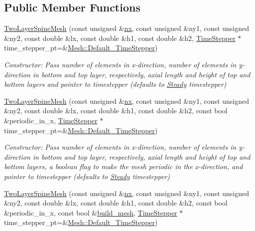 \subsection*{Public Member Functions}
\begin{DoxyCompactItemize}
\item 
\hyperlink{classoomph_1_1TwoLayerSpineMesh_a0c41a93e9ccaaa34956215e64611be2a}{Two\+Layer\+Spine\+Mesh} (const unsigned \&\hyperlink{classoomph_1_1RectangularQuadMesh_abfef93d6322886cdce14a437186e4821}{nx}, const unsigned \&ny1, const unsigned \&ny2, const double \&lx, const double \&h1, const double \&h2, \hyperlink{classoomph_1_1TimeStepper}{Time\+Stepper} $\ast$time\+\_\+stepper\+\_\+pt=\&\hyperlink{classoomph_1_1Mesh_a12243d0fee2b1fcee729ee5a4777ea10}{Mesh\+::\+Default\+\_\+\+Time\+Stepper})
\begin{DoxyCompactList}\small\item\em Constructor\+: Pass number of elements in x-\/direction, number of elements in y-\/direction in bottom and top layer, respectively, axial length and height of top and bottom layers and pointer to timestepper (defaults to \hyperlink{classoomph_1_1Steady}{Steady} timestepper) \end{DoxyCompactList}\item 
\hyperlink{classoomph_1_1TwoLayerSpineMesh_a8787a305ee929d001542464529e23787}{Two\+Layer\+Spine\+Mesh} (const unsigned \&\hyperlink{classoomph_1_1RectangularQuadMesh_abfef93d6322886cdce14a437186e4821}{nx}, const unsigned \&ny1, const unsigned \&ny2, const double \&lx, const double \&h1, const double \&h2, const bool \&periodic\+\_\+in\+\_\+x, \hyperlink{classoomph_1_1TimeStepper}{Time\+Stepper} $\ast$time\+\_\+stepper\+\_\+pt=\&\hyperlink{classoomph_1_1Mesh_a12243d0fee2b1fcee729ee5a4777ea10}{Mesh\+::\+Default\+\_\+\+Time\+Stepper})
\begin{DoxyCompactList}\small\item\em Constructor\+: Pass number of elements in x-\/direction, number of elements in y-\/direction in bottom and top layer, respectively, axial length and height of top and bottom layers, a boolean flag to make the mesh periodic in the x-\/direction, and pointer to timestepper (defaults to \hyperlink{classoomph_1_1Steady}{Steady} timestepper) \end{DoxyCompactList}\item 
\hyperlink{classoomph_1_1TwoLayerSpineMesh_a374454978976c3873a89bedc688b983f}{Two\+Layer\+Spine\+Mesh} (const unsigned \&\hyperlink{classoomph_1_1RectangularQuadMesh_abfef93d6322886cdce14a437186e4821}{nx}, const unsigned \&ny1, const unsigned \&ny2, const double \&lx, const double \&h1, const double \&h2, const bool \&periodic\+\_\+in\+\_\+x, const bool \&\hyperlink{classoomph_1_1RectangularQuadMesh_afa579b413a2d8120e8228d840cb3582c}{build\+\_\+mesh}, \hyperlink{classoomph_1_1TimeStepper}{Time\+Stepper} $\ast$time\+\_\+stepper\+\_\+pt=\&\hyperlink{classoomph_1_1Mesh_a12243d0fee2b1fcee729ee5a4777ea10}{Mesh\+::\+Default\+\_\+\+Time\+Stepper})

\end{DoxyCompactItemize}
